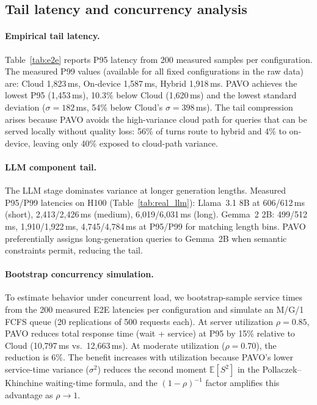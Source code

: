 \documentclass{article}
\begin{document}
\subsection{Tail latency and concurrency analysis}
\label{sec:concurrency}

\paragraph{Empirical tail latency.}
Table~\ref{tab:e2e} reports P95 latency from 200 measured samples per configuration. The measured P99 values (available for all fixed configurations in the raw data) are: Cloud 1{,}823\,ms, On-device 1{,}587\,ms, Hybrid 1{,}918\,ms. PAVO achieves the lowest P95 (1{,}453\,ms), 10.3\% below Cloud (1{,}620\,ms) and the lowest standard deviation ($\sigma=182$\,ms, 54\% below Cloud's $\sigma=398$\,ms). The tail compression arises because PAVO avoids the high-variance cloud path for queries that can be served locally without quality loss: 56\% of turns route to hybrid and 4\% to on-device, leaving only 40\% exposed to cloud-path variance.

\paragraph{LLM component tail.}
The LLM stage dominates variance at longer generation lengths. Measured P95/P99 latencies on H100 (Table~\ref{tab:real_llm}): Llama~3.1 8B at 606/612\,ms (short), 2{,}413/2{,}426\,ms (medium), 6{,}019/6{,}031\,ms (long). Gemma~2 2B: 499/512\,ms, 1{,}910/1{,}922\,ms, 4{,}745/4{,}784\,ms at P95/P99 for matching length bins. PAVO preferentially assigns long-generation queries to Gemma~2B when semantic constraints permit, reducing the tail.

\paragraph{Bootstrap concurrency simulation.}
To estimate behavior under concurrent load, we bootstrap-sample service times from the 200 measured E2E latencies per configuration and simulate an M/G/1 FCFS queue (20 replications of 500 requests each). At server utilization $\rho=0.85$, PAVO reduces total response time (wait + service) at P95 by 15\% relative to Cloud (10{,}797\,ms vs.\ 12{,}663\,ms). At moderate utilization ($\rho=0.70$), the reduction is 6\%. The benefit increases with utilization because PAVO's lower service-time variance ($\sigma^2$) reduces the second moment $\mathbb{E}[S^2]$ in the Pollaczek--Khinchine waiting-time formula, and the $(1-\rho)^{-1}$ factor amplifies this advantage as $\rho\to 1$.
\end{document}
